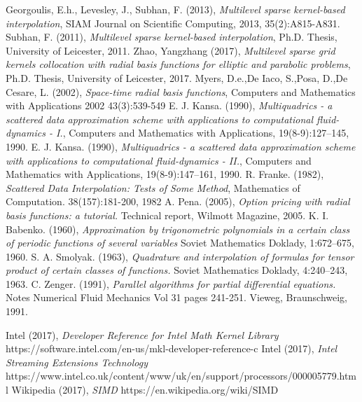 \documentclass[a4paper]{amsart}
\begin{document}
\begin{thebibliography}{99}
 Georgoulis, E.h., Levesley, J., Subhan, F. (2013), {\em Multilevel sparse kernel-based interpolation}, SIAM Journal on Scientific Computing, 2013, 35(2):A815-A831.
 Subhan, F. (2011), {\em Multilevel sparse kernel-based interpolation}, Ph.D. Thesis, University of Leicester, 2011.
 Zhao, Yangzhang (2017), {\em Multilevel sparse grid kernels collocation with radial basis functions for elliptic and parabolic problems}, Ph.D. Thesis, University of Leicester, 2017.
 Myers, D.e.,De Iaco, S.,Posa, D.,De Cesare, L. (2002), {\em Space-time radial basis functions}, Computers and Mathematics with Applications 2002 43(3):539-549
 E. J. Kansa. (1990), {\em Multiquadrics - a scattered data approximation scheme
with applications to computational fluid-dynamics - I.}, Computers and Mathematics with Applications, 19(8-9):127–145, 1990.
 E. J. Kansa. (1990), {\em Multiquadrics - a scattered data approximation scheme
with applications to computational fluid-dynamics - II.}, Computers and Mathematics with Applications, 19(8-9):147–161, 1990.
 R. Franke. (1982), {\em Scattered Data Interpolation: Tests of Some Method}, Mathematics of Computation. 38(157):181-200, 1982
 A. Pena. (2005), {\em Option pricing with radial basis functions: a tutorial.} Technical
report, Wilmott Magazine, 2005.
 K. I. Babenko. (1960), {\em Approximation by trigonometric polynomials in a certain class of periodic functions of several variables} Soviet Mathematics Doklady, 1:672–675, 1960.
 S. A. Smolyak. (1963), {\em Quadrature and interpolation of formulas for tensor product of certain classes of functions.} Soviet Mathematics Doklady, 4:240–243, 1963.
 C. Zenger. (1991), {\em Parallel algorithms for partial differential equations.} Notes Numerical Fluid Mechanics Vol 31 pages 241-251. Vieweg, Braunschweig, 1991.

 Intel (2017), {\em Developer Reference for Intel Math Kernel Library} https://software.intel.com/en-us/mkl-developer-reference-c
 Intel (2017), {\em Intel Streaming Extensions Technology} https://www.intel.co.uk/content/www/uk/en/support/processors/000005779.html
 Wikipedia (2017), {\em SIMD} https://en.wikipedia.org/wiki/SIMD


\end{thebibliography}
\end{document}

